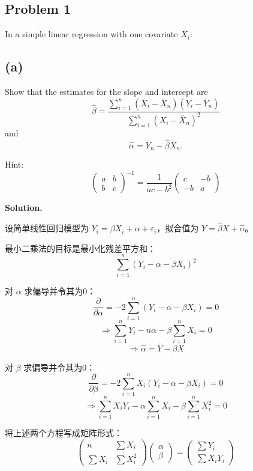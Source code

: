 \subsection{Problem 1}

In a simple linear regression with one covariate $X_i$:

\subsection*{(a)}

Show that the estimates for the slope and intercept are
\[
\widehat{\beta} = \frac{\sum_{i=1}^{n}(X_i - \overline{X}_n)(Y_i - \overline{Y}_n)}{\sum_{i=1}^{n}(X_i - \overline{X}_n)^2}
\]
and
\[
\widehat{\alpha} = \overline{Y}_n - \widehat{\beta}\overline{X}_n.
\]

Hint:
\[
\begin{pmatrix} a & b \\ b & c \end{pmatrix}^{-1} = \frac{1}{ac - b^2} \begin{pmatrix} c & -b \\ -b & a \end{pmatrix}
\]

\textbf{Solution.}

设简单线性回归模型为 $Y_i = \beta X_i + \alpha + \varepsilon_i$，拟合值为 $\widehat{Y} = \widehat{\beta} X + \widehat{\alpha}$。

最小二乘法的目标是最小化残差平方和：
\[
\sum_{i=1}^{n}(Y_i - \alpha - \beta X_i)^2
\]

对 $\alpha$ 求偏导并令其为0：
\[
\frac{\partial}{\partial \alpha} = -2\sum_{i=1}^{n}(Y_i - \alpha - \beta X_i) = 0
\]
\[
\Rightarrow \sum_{i=1}^{n} Y_i - n\alpha - \beta\sum_{i=1}^{n} X_i = 0
\]
\[
\Rightarrow \widehat{\alpha} = \overline{Y} - \beta\overline{X}
\]

对 $\beta$ 求偏导并令其为0：
\[
\frac{\partial}{\partial \beta} = -2\sum_{i=1}^{n} X_i(Y_i - \alpha - \beta X_i) = 0
\]
\[
\Rightarrow \sum_{i=1}^{n} X_i Y_i - \alpha\sum_{i=1}^{n} X_i - \beta\sum_{i=1}^{n} X_i^2 = 0
\]

将上述两个方程写成矩阵形式：
\[
\begin{pmatrix} n & \sum X_i \\ \sum X_i & \sum X_i^2 \end{pmatrix} \begin{pmatrix} \alpha \\ \beta \end{pmatrix} = \begin{pmatrix} \sum Y_i \\ \sum X_i Y_i \end{pmatrix}
\]

